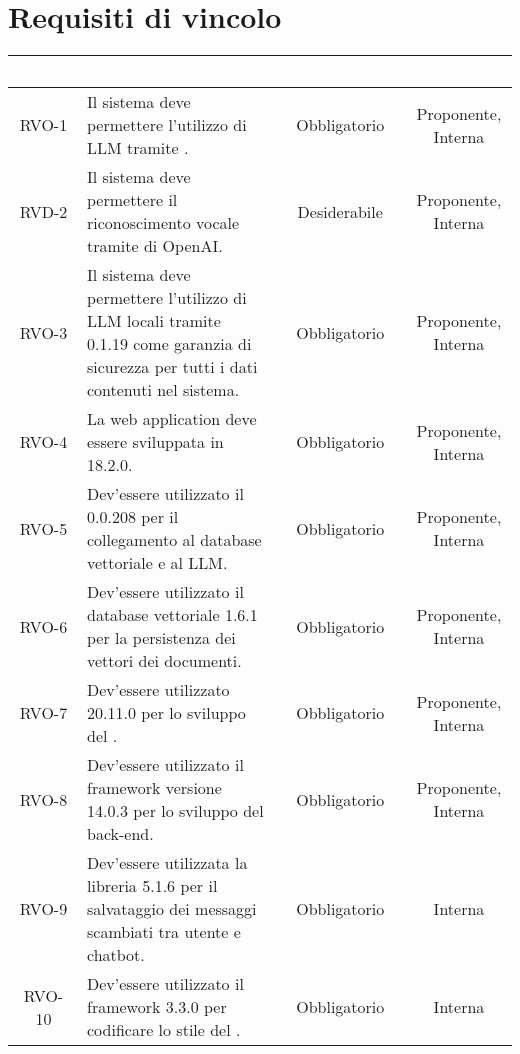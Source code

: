 \section{Requisiti di vincolo}

\begingroup
\setlength{\tabcolsep}{10pt}
\renewcommand{\arraystretch}{1.5}
\begin{xltabular}{\textwidth}{| c | X | c | c |}
    \hline
     \textbf{\textcolor{white}{Codice}} & \textbf{\textcolor{white}{Descrizione}} & \textbf{\textcolor{white}{Classificazione}} & \textbf{\textcolor{white}{Fonte}}\\
    \hline
    \endhead
   
    RVO-1 & Il sistema deve permettere l'utilizzo di LLM tramite . & Obbligatorio & Proponente, Interna \\
    \hline
    RVD-2 & Il sistema deve permettere il riconoscimento vocale tramite  di OpenAI. & Desiderabile & Proponente, Interna \\
    \hline
    RVO-3 & Il sistema deve permettere l'utilizzo di LLM locali tramite  0.1.19 come garanzia di sicurezza per tutti i dati contenuti nel sistema. & Obbligatorio & Proponente, Interna \\
    \hline
    RVO-4 & La web application deve essere sviluppata in  18.2.0. & Obbligatorio & Proponente, Interna \\
    \hline
    RVO-5 & Dev'essere utilizzato il   0.0.208 per il collegamento al database vettoriale e al LLM. & Obbligatorio & Proponente, Interna \\
    \hline
    RVO-6 & Dev'essere utilizzato il database vettoriale  1.6.1 per la persistenza dei vettori  dei documenti. & Obbligatorio & Proponente, Interna \\
    \hline
    RVO-7 & Dev'essere utilizzato  20.11.0 per lo sviluppo del . & Obbligatorio & Proponente, Interna \\
    \hline
    RVO-8 & Dev'essere utilizzato il framework  versione 14.0.3 per lo sviluppo del back-end. & Obbligatorio & Proponente, Interna \\
    \hline
    RVO-9 & Dev'essere utilizzata la libreria  5.1.6 per il salvataggio dei messaggi scambiati tra utente e chatbot. & Obbligatorio & Interna \\
    \hline
    RVO-10 & Dev'essere utilizzato il framework  3.3.0 per codificare lo stile del . & Obbligatorio & Interna \\

\end{xltabular}
